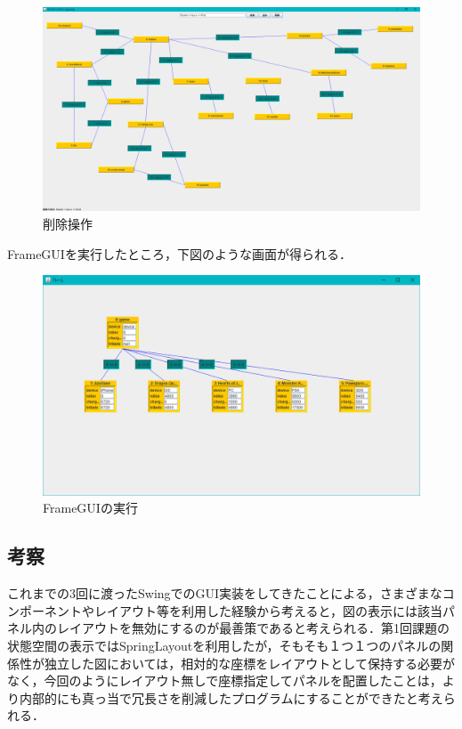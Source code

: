 \documentclass[12pt]{jarticle}
\begin{document}
\begin{figure}[!hbt]
  	\begin{center}
  		\includegraphics[scale=0.30]{images/gui4.png}
	\end{center}
  	\caption{削除操作}
\end{figure}
\clearpage

FrameGUIを実行したところ，下図のような画面が得られる．

\begin{figure}[!hbt]
  	\begin{center}
  	  	\includegraphics[scale=0.50]{images/gui5.png}
	\end{center}
  	\caption{FrameGUIの実行}
\end{figure}
\clearpage


\subsection{考察}
これまでの3回に渡ったSwingでのGUI実装をしてきたことによる，さまざまなコンポーネントやレイアウト等を利用した経験から考えると，図の表示には該当パネル内のレイアウトを無効にするのが最善策であると考えられる．第1回課題の状態空間の表示ではSpringLayoutを利用したが，そもそも１つ１つのパネルの関係性が独立した図においては，相対的な座標をレイアウトとして保持する必要がなく，今回のようにレイアウト無しで座標指定してパネルを配置したことは，より内部的にも真っ当で冗長さを削減したプログラムにすることができたと考えられる．
\end{document}
